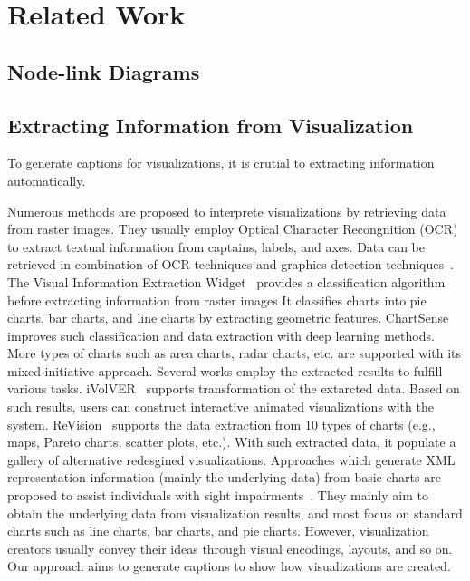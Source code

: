 \section{Related Work}\label{sec:relatedwork}
\subsection{Node-link Diagrams}
\subsection{Extracting Information from Visualization}
To generate captions for visualizations, it is crutial to extracting information automatically.

Numerous methods are proposed to interprete visualizations by retrieving data from raster images.
They usually employ Optical Character Recongnition (OCR) to extract textual information from captains, labels, and axes.
Data can be retrieved in combination of OCR techniques and graphics detection techniques~\cite{DBLP:conf/icip/ZhouT00, DBLP:conf/doceng/HuangT07}.
The Visual Information Extraction Widget~\cite{DBLP:conf/icip/GaoZB12} provides a  classification algorithm before extracting information from raster images
It classifies charts into pie charts, bar charts, and line charts by extracting geometric features.
ChartSense~\cite{DBLP:conf/chi/JungKSHLKS17} improves such classification and data extraction with deep learning methods. More types of charts such as area charts, radar charts, etc. are supported with its mixed-initiative approach. 
Several works employ the extracted results to fulfill various tasks.
iVolVER~\cite{DBLP:conf/chi/MendezNV16} supports transformation of the extarcted data. Based on such results, users can construct interactive animated visualizations with the system.
ReVision~\cite{DBLP:conf/uist/SavvaKCFAH11} supports the data extraction from 10 types of charts (e.g., maps, Pareto charts, scatter plots, etc.). With such extracted data, it populate a gallery of alternative redesgined visualizations.
Approaches which generate XML representation information (mainly the underlying data) from basic charts are proposed to assist individuals with sight impairments~\cite{DBLP:conf/ismis/ChesterE05, DBLP:journals/tiis/CarberrySMDWGCSOM12, DBLP:journals/cgf/ChoiJPCE19}. 
They mainly aim to obtain the underlying data from visualization results, and most focus on standard charts such as line charts, bar charts, and pie charts.
However, visualization creators usually convey their ideas through visual encodings, layouts, and so on.
Our approach aims to generate captions to show how visualizations are created.

